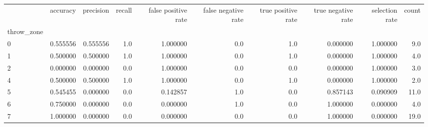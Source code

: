 \begin{tabular}{lrrrrrrrrr}
\toprule
{} &  accuracy &  precision &  recall &  false positive rate &  false negative rate &  true positive rate &  true negative rate &  selection rate &  count \\
throw\_zone &           &            &         &                      &                      &                     &                     &                 &        \\
\midrule
0          &  0.555556 &   0.555556 &     1.0 &             1.000000 &                  0.0 &                 1.0 &            0.000000 &        1.000000 &    9.0 \\
1          &  0.500000 &   0.500000 &     1.0 &             1.000000 &                  0.0 &                 1.0 &            0.000000 &        1.000000 &    4.0 \\
2          &  0.000000 &   0.000000 &     0.0 &             1.000000 &                  0.0 &                 0.0 &            0.000000 &        1.000000 &    3.0 \\
4          &  0.500000 &   0.500000 &     1.0 &             1.000000 &                  0.0 &                 1.0 &            0.000000 &        1.000000 &    2.0 \\
5          &  0.545455 &   0.000000 &     0.0 &             0.142857 &                  1.0 &                 0.0 &            0.857143 &        0.090909 &   11.0 \\
6          &  0.750000 &   0.000000 &     0.0 &             0.000000 &                  1.0 &                 0.0 &            1.000000 &        0.000000 &    4.0 \\
7          &  1.000000 &   0.000000 &     0.0 &             0.000000 &                  0.0 &                 0.0 &            1.000000 &        0.000000 &   19.0 \\
\bottomrule
\end{tabular}
